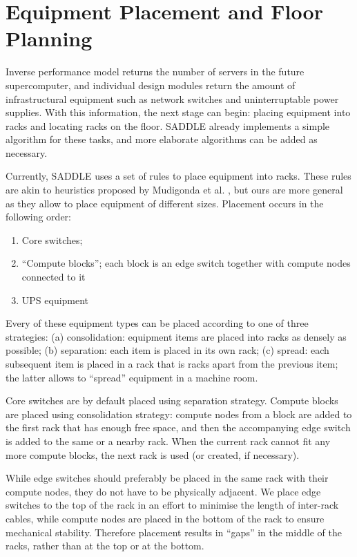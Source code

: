 \documentclass[runningheads,a4paper]{llncs}
\begin{document}
\section{Equipment Placement and Floor Planning}

Inverse performance model returns the number of servers in the future supercomputer, and individual design modules return the amount of infrastructural equipment such as network switches and uninterruptable power supplies. With this information, the next stage can begin: placing equipment into racks and locating racks on the floor. SADDLE already implements a simple algorithm for these tasks, and more elaborate algorithms can be added as necessary.

Currently, SADDLE uses a set of rules to place equipment into racks. These rules are akin to heuristics proposed by Mudigonda et al. \cite{mudigonda2011taming}, but ours are more general as they allow to place equipment of different sizes. Placement occurs in the following order:

\begin{enumerate}
\item Core switches;
\item ``Compute blocks''; each block is an edge switch together with compute nodes connected to it
\item UPS equipment
\end{enumerate}

Every of these equipment types can be placed according to one of three strategies: (a) consolidation: equipment items are placed into racks as densely as possible; (b) separation: each item is placed in its own rack; (c) spread: each subsequent item is placed in a rack that is  racks apart from the previous item; the latter allows to ``spread'' equipment in a machine room.

Core switches are by default placed using separation strategy. Compute blocks are placed using consolidation strategy: compute nodes from a block are added to the first rack that has enough free space, and then the accompanying edge switch is added to the same or a nearby rack. When the current rack cannot fit any more compute blocks, the next rack is used (or created, if necessary).

While edge switches should preferably be placed in the same rack with their compute nodes, they do not have to be physically adjacent. We place edge switches to the top of the rack in an effort to minimise the length of inter-rack cables, while compute nodes are placed in the bottom of the rack to ensure mechanical stability. Therefore placement results in ``gaps'' in the middle of the racks, rather than at the top or at the bottom.
\end{document}
